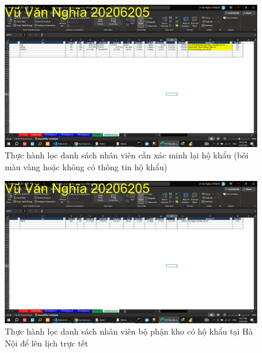 \documentclass{article}
\begin{document}
\begin{figure}[h]
    \centering
    \includegraphics[scale = 0.15]{Video2/ThucHanh/6.png}
    \caption{Thực hành lọc danh sách nhân viên cần xác minh lại hộ khẩu (bôi màu vàng hoặc không có thông tin hộ khẩu)}
\end{figure}

\begin{figure}[h]
    \centering
    \includegraphics[scale = 0.15]{Video2/ThucHanh/7.png}
    \caption{Thực hành lọc danh sách nhân viên bộ phận kho có hộ khẩu tại Hà Nội để lên lịch trực tết}
\end{figure}








\end{document}
